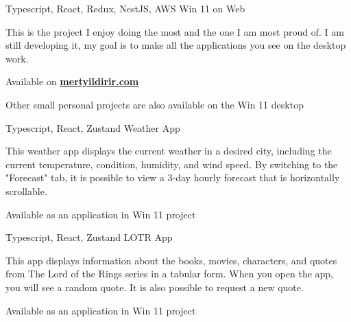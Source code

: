 

\begin{cventries}


  \cventry
  {Typescript, React, Redux, NestJS, AWS}
  {Win 11 on Web} %
  {} %
  {} %
  {
    \begin{cvitems} %
      \item {This is the project I enjoy doing the most and the one I am most proud of. 
      I am still developing it, my goal is to make all the applications you see on the desktop work.}
      \item {Available on }{\href{https://www.mertyildirir.com}{\color{awesome-skyblue}\textbf{mertyildirir.com}}}
      \item {Other small personal projects are also available on the Win 11 desktop}
    \end{cvitems}
  }


  \cventry
  {Typescript, React, Zustand}
  {Weather App} %
  {} %
  {} %
  {
    \begin{cvitems} %
      \item {This weather app displays the current weather in a desired city, including the current temperature, condition, humidity, 
      and wind speed. By switching to the "Forecast" tab, 
      it is possible to view a 3-day hourly forecast that is horizontally scrollable.}
      \item {Available as an application in Win 11 project}
    \end{cvitems}
  }







  \cventry
  {Typescript, React, Zustand}
  {LOTR App}
  {} %
  {} %
  { \begin{cvitems} %
    \item {This app displays information about the books, movies, characters, and quotes from 
    The Lord of the Rings series in a tabular form. When you open the app, you will see a random quote. 
    It is also possible to request a new quote.}
    \item {Available as an application in Win 11 project}
  \end{cvitems}
  }
\end{cventries}
